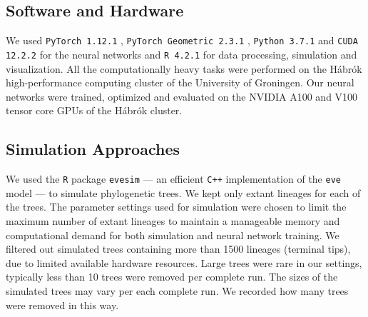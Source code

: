 {\subsection{Software and Hardware}
\label{ch3::sec::methods::environment}
We used \texttt{PyTorch 1.12.1} \citep{prakash_pytorch_2021}, \texttt{PyTorch Geometric 2.3.1} \citep{fey_fast_2019}, \texttt{Python 3.7.1} and \texttt{CUDA 12.2.2} \citep{luebke_cuda_2008} for the neural networks and \texttt{R 4.2.1} \citep{r_core_team_r_2025} for data processing, simulation and visualization. All the computationally heavy tasks were performed on the Hábrók high-performance computing cluster of the University of Groningen. Our neural networks were trained, optimized and evaluated on the NVIDIA A100 and V100 tensor core GPUs of the Hábrók cluster.

\subsection{Simulation Approaches}
\label{ch3::sec::methods::simulation}
\begin{table}
    \caption{Parameter settings for the simulated tree datasets using different model settings. The ``Complexity'' column specifies which level of model complexity the datasets belong to, with regard to the number of parameters. Each complexity level is crossed with all three evolutionary scenarios as described in the methods. All simulated trees have identical crown age of 10 time units. For each complexity level and evolutionary scenario combination, 100,000 trees were simulated. The sub-columns under each of the parameters specify the lower ($min$) and the upper ($max$) bounds of the parameter space; all parameters are sampled from $U(min, max)$, where $U$ denotes uniform distribution. $\lambda_0$: intrinsic speciation rate rate; $\mu_0$: intrinsic extinction rate rate; $\beta_N$: effect size of species richness on speciation; $\beta_\varPhi$: effect size of evolutionary relatedness on speciation; $\gamma_N$: effect size of species richness on extinction; $\gamma_\varPhi$: effect size of evolutionary relatedness on extinction. For each parameter, the symbol ``--'' indicates that this parameter is always $0$, thus disabling its impact on the simulation.}
    
    \label{ch3::table::simulated_trees}
\end{table}

We used the \texttt{R} package \texttt{evesim} \citep{qin_impact_2025} --- an efficient \texttt{C++} implementation of the \texttt{eve} model --- to simulate phylogenetic trees. We kept only extant lineages for each of the trees. The parameter settings used for simulation were chosen to limit the maximum number of extant lineages to maintain a manageable memory and computational demand for both simulation and neural network training. We filtered out simulated trees containing more than 1500 lineages (terminal tips), due to limited available hardware resources. Large trees were rare in our settings, typically less than 10 trees were removed per complete run. The sizes of the simulated trees may vary per each complete run. We recorded how many trees were removed in this way.

}
